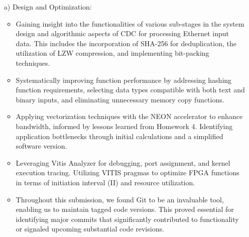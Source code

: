 \documentclass[../main.tex]{subfiles}
\begin{document}
\begin{enumerate}
    \item[a)] Design and Optimization:
    \begin{itemize}
        \item Gaining insight into the functionalities of various sub-stages in the system design and algorithmic aspects of CDC for processing Ethernet input data. This includes the incorporation of SHA-256 for deduplication, the utilization of LZW compression, and implementing bit-packing techniques.\\
        \item Systematically improving function performance by addressing hashing function requirements, selecting data types compatible with both text and binary inputs, and eliminating unnecessary memory copy functions. \\
        \item Applying vectorization techniques with the NEON accelerator to enhance bandwidth, informed by lessons learned from Homework 4. Identifying application bottlenecks through initial calculations and a simplified software version. \\
        \item Leveraging Vitis Analyzer for debugging, port assignment, and kernel execution tracing. Utilizing VITIS pragmas to optimize FPGA functions in terms of initiation interval (II) and resource utilization. \\
        \item Throughout this submission, we found Git to be an invaluable tool, enabling us to maintain tagged code versions. This proved essential for identifying major commits that significantly contributed to functionality or signaled upcoming substantial code revisions. \\
    \end{itemize}


\end{enumerate}
\end{document}
